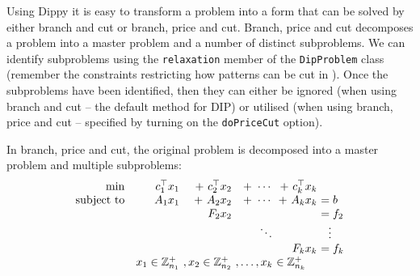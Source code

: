 Using Dippy it is easy to transform a problem into a form that can be solved by either branch and cut or branch, price and cut. Branch, price and cut decomposes a problem into a master problem and a number of distinct subproblems. We can identify subproblems using the \texttt{relaxation} member of the \texttt{DipProblem} class (remember the constraints restricting how patterns can be cut in ). Once the subproblems have been identified, then they can either be ignored (when using branch and cut -- the default method for \ac{DIP}) or utilised (when using branch, price and cut -- specified by turning on the \texttt{doPriceCut} option).

\vfill
\newpage

In branch, price and cut, the original problem is decomposed into a master problem and multiple subproblems:
\begin{equation}
\begin{array}{rr@{\ }r@{\ }r@{\ }r@{\ }l}
             \min & c_1^\top x_1 & + \ c_2^\top x_2 & + \ \cdots & + \ c_k^\top x_k \\
\text{subject to} & A_1 x_1      & + \ A_2 x_2      & + \ \cdots & + \ A_k x_k      & = b \\
                  &              &   F_2 x_2      &          &                & = f_2 \\
                  &              &                &  \ddots  &                & \ \ \vdots \\
                  &              &                &          &   F_k x_k      & = f_k \\
                  & x_1 \in \mathbb{Z}^{+}_{n_1} &, x_2 \in \mathbb{Z}^{+}_{n_2}&, \ldots, x_k & \in \mathbb{Z}^{+}_{n_k} \quad
\end{array}
\label{eqn:decomp}
\end{equation}

